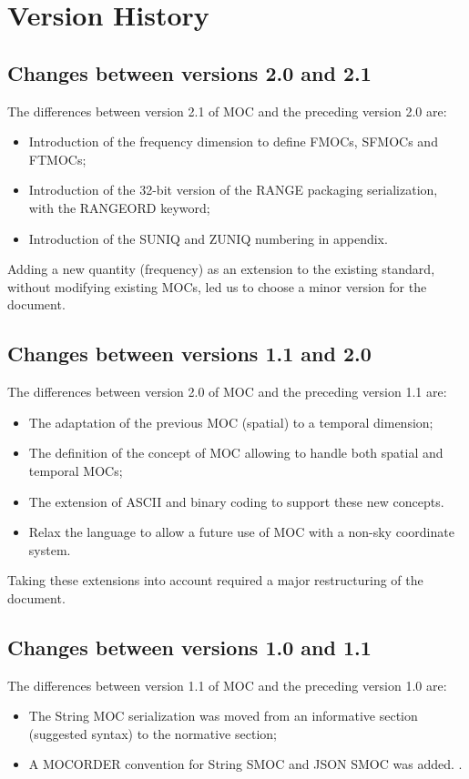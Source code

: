 \documentclass[11pt,a4paper]{ivoa}
\begin{document}
\appendix
\section{Version History}

\subsection{Changes between versions 2.0 and 2.1}

The differences between version 2.1 of MOC and the preceding version 2.0 are:
\begin{itemize}
  \item Introduction of the frequency dimension to define FMOCs, SFMOCs and FTMOCs;
  \item Introduction of the 32-bit version of the RANGE packaging serialization, with the RANGEORD keyword;
  \item Introduction of the SUNIQ and ZUNIQ numbering in appendix.
\end{itemize}
Adding a new quantity (frequency) as an extension to the existing standard, 
without modifying existing MOCs, led us to choose a minor version for the document.


\subsection{Changes between versions 1.1 and 2.0}

The differences between version 2.0 of MOC and the preceding version 1.1 are:
\begin{itemize}
   \item The adaptation of the previous MOC (spatial) to a temporal
     dimension;
   \item The definition of the concept of MOC allowing to handle both
     spatial and temporal MOCs;
   \item The extension of ASCII and binary coding to support these new
     concepts.
    \item Relax the language to allow a future use of MOC with a non-sky coordinate system. 
\end{itemize}
Taking these extensions into account required a major restructuring of
the document.

\subsection{Changes between versions 1.0 and 1.1}
The differences between version 1.1 of MOC and the preceding version
1.0 are:
\begin{itemize}
   \item The String MOC serialization was moved from an informative
     section (suggested syntax) to the normative section;
   \item A MOCORDER convention for String SMOC and JSON SMOC was added.
     \citep{2020arXiv200707519D}.
\end{itemize}



\newpage


\newpage


\end{document}
